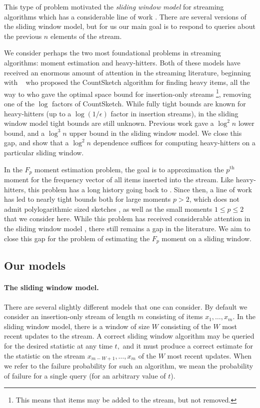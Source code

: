 \documentclass{article}
\theoremstyle{plain}
\begin{document}
This type of problem motivated the \textit{sliding window model} for streaming algorithms which has a considerable line of work \cite{datar2002maintaining, 2007, braverman2018nearly, woodruff2022tight}. There are several versions of the sliding window model, but for us our main goal is to respond to queries about the previous $n$ elements of the stream. 

We consider perhaps the two most foundational problems in streaming algorithms: moment estimation and heavy-hitters.  Both of these models have received an enormous amount of attention in the streaming literature, beginning with ~\cite{charikar2002finding} who proposed the CountSketch algorithm for finding heavy items, all the way to \cite{braverman2017bptree} who gave the optimal space bound for insertion-only streams \footnote{This means that items may be added to the stream, but not removed.}, removing one of the $\log$ factors of CountSketch.  While fully tight bounds are known for heavy-hitters (up to a $\log(1/\epsilon)$ factor in insertion streams), in the sliding window model tight bounds are still unknown.  Previous work \cite{braverman2018nearly} gave a $\log^2 n$ lower bound, and a $\log^3 n$ upper bound in the sliding window model.  We close this gap, and show that a $\log^2 n$ dependence suffices for computing heavy-hitters on a particular sliding window.

In the $F_p$ moment estimation problem, the goal is to approximation the $p^{\text{th}}$ moment for the frequency vector of all items inserted into the stream.  Like heavy-hitters, this problem has a long history going back to \cite{alon1996space}.  Since then, a line of work has led to nearly tight bounds both for large moments $p > 2$, which does not admit polylogarithmic sized sketches \cite{bar2004information, indyk2005optimal}, as well as the small moments $1 \leq p \leq 2$ \cite{indyk2006stable, kane2010exact} that we consider here.  While this problem has received considerable attention in the sliding window model \cite{2007, braverman2010effective, woodruff2022tight}, there still remains a gap in the literature.  We aim to close this gap for the problem of estimating the $F_p$ moment on a sliding window.


\subsection{Our models}
\paragraph{The sliding window model.}
There are several slightly different models that one can consider.  By default we consider an insertion-only stream of length $m$ consisting of items $x_1, \ldots, x_m.$  In the sliding window model, there is a window of size $W$ consisting of the $W$ most recent updates to the stream.  A correct sliding window algorithm may be queried for the desired statistic at any time $t,$ and it must produce a correct estimate for the statistic on the stream $x_{m - W + 1}, \ldots, x_m$ of the $W$ most recent updates.  When we refer to the failure probability for such an algorithm, we mean the probability of failure for a single query (for an arbitrary value of $t$).
\end{document}

